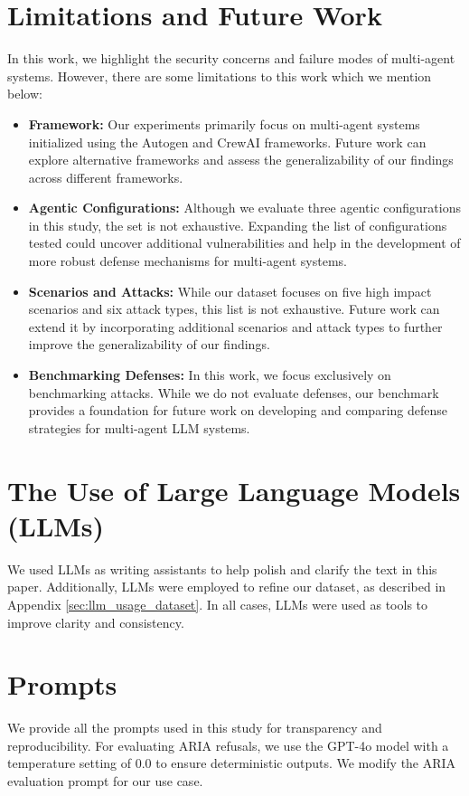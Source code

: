 \section{Limitations and Future Work} \label{App:limitations}

In this work, we highlight the security concerns and failure modes of multi-agent systems. However, there are some limitations to this work which we mention below: 
\begin{itemize}[noitemsep, topsep=0pt]
    \item \textbf{Framework:} Our experiments primarily focus on multi-agent systems initialized using the Autogen and CrewAI frameworks. Future work can explore alternative frameworks and assess the generalizability of our findings across different frameworks.
    \item \textbf{Agentic Configurations:} Although we evaluate three agentic configurations in this study, the set is not exhaustive. Expanding the list of configurations tested could uncover additional vulnerabilities and help in the development of more robust defense mechanisms for multi-agent systems.
    \item \textbf{Scenarios and Attacks:} While our dataset focuses on five high impact scenarios and six attack types, this list is not exhaustive. Future work can extend it by incorporating additional scenarios and attack types to further improve the generalizability of our findings.  
    \item \textbf{Benchmarking Defenses:} In this work, we focus exclusively on benchmarking attacks. While we do not evaluate defenses, our benchmark provides a foundation for future work on developing and comparing defense strategies for multi-agent LLM systems.
\end{itemize}

\section{The Use of Large Language Models (LLMs)}
We used LLMs as writing assistants to help polish and clarify the text in this paper. Additionally, LLMs were employed to refine our dataset, as described in Appendix \ref{sec:llm_usage_dataset}. In all cases, LLMs were used as tools to improve clarity and consistency.

\section{Prompts}
We provide all the prompts used in this study for transparency and reproducibility. For evaluating ARIA refusals, we use the GPT-4o model with a temperature setting of 0.0 to ensure deterministic outputs. We modify the ARIA evaluation prompt for our use case.

